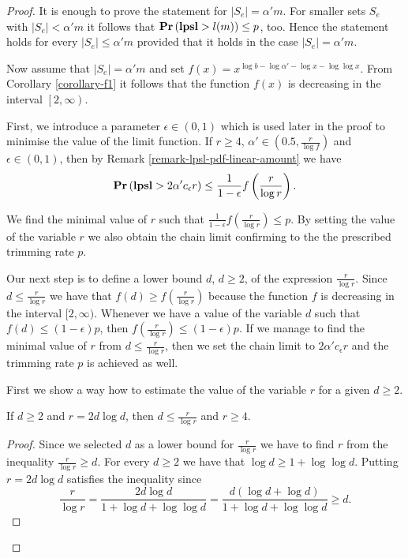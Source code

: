 \begin{proof}
It is enough to prove the statement for $|S_e| = \alpha' m$. For smaller sets $S_e$ with $|S_e| < \alpha' m$ it follows that $\mathbf{Pr}\left(\mathbf{lpsl} > l(m)\right) \leq p$, too. Hence the statement holds for every $|S_e| \leq \alpha'm$ provided that it holds in the case $|S_e| = \alpha' m$.

Now assume that $|S_e| = \alpha' m$ and set $f(x) = x ^ {\log b - \log \alpha' - \log x - \log \log x}$. From Corollary \ref{corollary-f1} it follows that the function $f(x)$ is decreasing in the interval $\left[2, \infty \right)$.

First, we introduce a parameter $\epsilon \in (0, 1)$ which is used later in the proof to minimise the value of the limit function. If $r \geq 4$, $\alpha' \in \left(0.5, \frac{r}{\log f}\right)$ and $\epsilon \in (0, 1)$, then by Remark \ref{remark-lpsl-pdf-linear-amount} we have
\[
	\mathbf{Pr}\left(\mathbf{lpsl} > 2 \alpha' c_\epsilon r\right) \leq \frac{1}{1 - \epsilon} f\left(\frac{r}{\log r}\right) \text{.}
\]

We find the minimal value of $r$ such that $\frac{1}{1 - \epsilon} f\left(\frac{r}{\log r}\right) \leq p$. By setting the value of the variable $r$ we also obtain the chain limit confirming to the the prescribed trimming rate $p$. 

Our next step is to define a lower bound $d$, $d \geq 2$, of the expression $\frac{r}{\log r}$. Since $d \leq \frac{r}{\log r}$ we have that $f(d) \geq f\left(\frac{r}{\log r}\right)$ because the function $f$ is decreasing in the interval $[2, \infty)$. Whenever we have a value of the variable $d$ such that $f(d) \leq (1 - \epsilon) p$, then $f\left(\frac{r}{\log r}\right) \leq (1- \epsilon) p$. If we manage to find the minimal value of $r$ from $d \leq \frac{r}{\log r}$, then we set the chain limit to $2 \alpha' c_\epsilon r$ and the trimming rate $p$ is achieved as well. 

First we show a way how to estimate the value of the variable $r$ for a given $d \geq 2$. 
\begin{claim}
\label{claim-choose-r}
If $d \geq 2$ and $r = 2d \log d$, then $d \leq \frac{r}{\log r}$ and $r \geq 4$.
\end{claim}
\begin{proof}
Since we selected $d$ as a lower bound for $\frac{r}{\log r}$ we have to find $r$ from the inequality $\frac{r}{\log r} \geq d$. For every $d \geq 2$ we have that $\log d \geq 1 + \log \log d$. Putting $r = 2 d \log d$ satisfies the inequality since
\[
\frac{r}{\log r} = \frac{2 d \log d}{1 + \log d + \log \log d} = \frac{d(\log d + \log d)}{1 + \log d + \log \log d} \geq d \text{.}
\]


\end{proof}
\end{proof}
